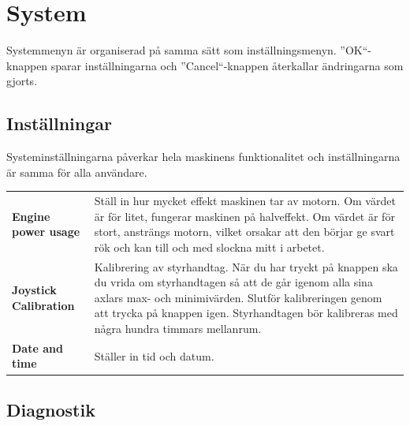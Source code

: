 \documentclass[12pt,a4paper,finnish]{uvmanual}
\begin{document}
\chapter{System}\label{ch:system}

Systemmenyn är organiserad på samma sätt som inställningsmenyn. ''OK``-knappen sparar inställningarna och ''Cancel``-knappen återkallar ändringarna som gjorts.

\section{Inställningar}\label{ch:system_settings}

Systeminställningarna påverkar hela maskinens funktionalitet och inställningarna är samma för alla användare.



\begin{tabular}{ L{0.2\textwidth} L{0.66\textwidth} }
\textbf{Engine power usage} & Ställ in hur mycket effekt maskinen tar av motorn. Om värdet är för litet, fungerar maskinen på halveffekt. Om värdet är för stort, ansträngs motorn, vilket orsakar att den börjar ge svart rök och kan till och med slockna mitt i arbetet. \\
\textbf{Joystick Calibration} & Kalibrering av styrhandtag. När du har tryckt på knappen ska du vrida om styrhandtagen så att de går igenom alla sina axlars max- och minimivärden. Slutför kalibreringen genom att trycka på knappen igen. Styrhandtagen bör kalibreras med några hundra timmars mellanrum.  \\
\textbf{Date and time} & Ställer in tid och datum. \\
\end{tabular}





\section{Diagnostik}\label{ch:system_diagnostics}
\end{document}
